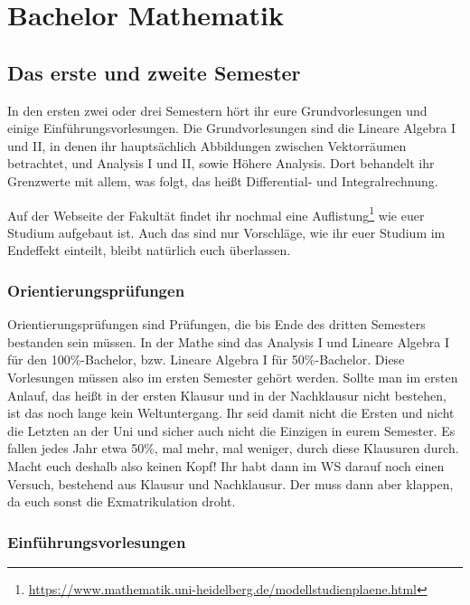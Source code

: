 \section{Bachelor Mathematik}


\subsection{Das erste und zweite Semester}

In den ersten zwei oder drei Semestern hört ihr eure Grundvorlesungen und einige Einführungsvorlesungen. Die Grundvorlesungen sind die Lineare Algebra I und II, in denen ihr hauptsächlich Abbildungen zwischen Vektorräumen betrachtet, und Analysis I und II, sowie Höhere Analysis. Dort behandelt ihr Grenzwerte mit allem, was folgt, das heißt Differential- und Integralrechnung.

Auf der Webseite der Fakultät findet ihr nochmal eine Auflistung\footnote{\url{https://www.mathematik.uni-heidelberg.de/modellstudienplaene.html}} wie euer Studium aufgebaut ist. Auch das sind nur Vorschläge, wie ihr euer Studium im Endeffekt einteilt, bleibt natürlich euch überlassen.

\subsubsection{Orientierungsprüfungen}

Orientierungsprüfungen sind Prüfungen, die bis Ende des dritten Semesters bestanden sein müssen. In der Mathe sind das Analysis I und Lineare Algebra I für den 100\%-Bachelor, bzw. Lineare Algebra I für 50\%-Bachelor. Diese Vorlesungen müssen also im ersten Semester gehört werden. Sollte man im ersten Anlauf, das heißt in der ersten Klausur und in der Nachklausur nicht bestehen, ist das noch lange kein Weltuntergang. Ihr seid damit nicht die Ersten und nicht die Letzten an der Uni und sicher auch nicht die Einzigen in eurem Semester. Es fallen jedes Jahr etwa 50\%, mal mehr, mal weniger, durch diese Klausuren durch. Macht euch deshalb also keinen Kopf! Ihr habt dann im WS darauf noch einen Versuch, bestehend aus Klausur und Nachklausur. Der muss dann aber klappen, da euch sonst die Exmatrikulation droht.

\subsubsection{Einführungsvorlesungen}

